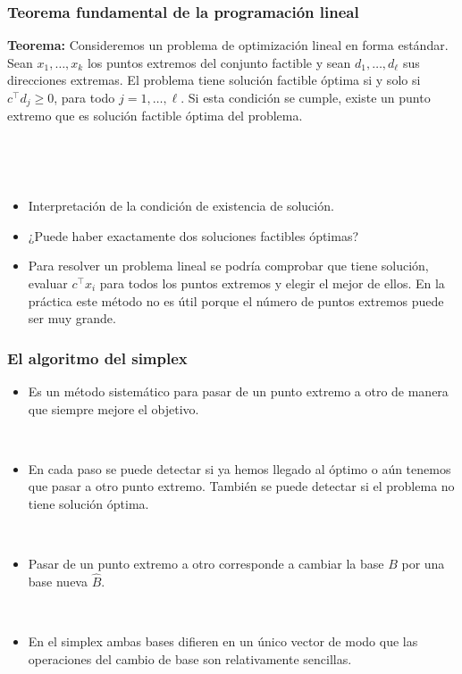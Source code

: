 \documentclass{beamer}
\begin{document}
\begin{frame}
\frametitle{Teorema fundamental de la programación lineal}

{\bf Teorema:} Consideremos un problema de optimización lineal en forma estándar.
Sean $x_1,\ldots, x_k$ los puntos extremos del conjunto factible y sean $d_1,\ldots,d_\ell$ sus direcciones extremas. El problema tiene solución factible óptima  si y solo si $c^\top d_j\geq 0$, para todo $j=1,\ldots,\ell$. Si esta condición se cumple, existe un punto extremo que es  solución factible óptima del problema.


\

\

\begin{itemize}
\item Interpretación de la condición de existencia de solución.

\item ¿Puede haber exactamente dos soluciones factibles óptimas?

\item  Para resolver un problema lineal se podría comprobar que tiene solución, evaluar $c^\top x_i$ para todos los puntos extremos y elegir el mejor de ellos. En la práctica este método no es útil porque el número de puntos extremos puede ser muy grande.
\end{itemize}

\end{frame}
\begin{frame}
\frametitle{El algoritmo del simplex}

\begin{itemize}
\item Es un método sistemático para pasar de un punto extremo a otro de manera que siempre mejore el objetivo.

\

\item En cada paso se puede detectar si ya hemos llegado al óptimo o aún tenemos que pasar a otro punto extremo. También se puede detectar si el problema no tiene solución óptima.

\

\item Pasar de un punto extremo a otro corresponde a cambiar la base $B$ por una base nueva $\hat{B}$. 

\

\item En el simplex ambas bases difieren en un único vector de modo que las operaciones del cambio de base son relativamente sencillas.
\end{itemize}


\end{frame}
\end{document}
